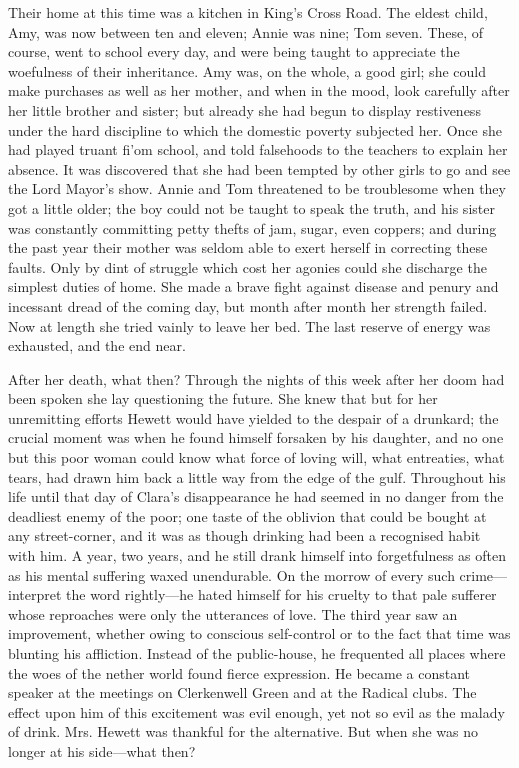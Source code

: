 Their home at this time was a kitchen in King's Cross Road. The eldest
child, Amy, was now between ten and eleven; Annie was
{\protect\hypertarget{161}{}{}}nine; Tom seven. These, of course, went
to school every day, and were being taught to appreciate the woefulness
of their inheritance. Amy was, on the whole, a good girl; she could make
purchases as well as her mother, and when in the mood, look carefully
after her little brother and sister; but already she had begun to
display restiveness under the hard discipline to which the domestic
poverty subjected her. Once she had played truant fi'om school, and told
falsehoods to the teachers to explain her absence. It was discovered
that she had been tempted by other girls to go and see the Lord Mayor's
show. Annie and Tom threatened to be troublesome when they got a little
older; the boy could not be taught to speak the truth, and his sister
was constantly committing petty thefts of jam, sugar, even coppers; and
during the past year their mother was seldom able to exert herself in
correcting these faults. Only by dint of struggle which cost her agonies
could she discharge the simplest duties of home. She made a brave fight
against disease and penury {\protect\hypertarget{162}{}{}}and incessant
dread of the coming day, but month after month her strength failed. Now
at length she tried vainly to leave her bed. The last reserve of energy
was exhausted, and the end near.

After her death, what then? Through the nights of this week after her
doom had been spoken she lay questioning the future. She knew that but
for her unremitting efforts Hewett would have yielded to the despair of
a drunkard; the crucial moment was when he found himself forsaken by his
daughter, and no one but this poor woman could know what force of loving
will, what entreaties, what tears, had drawn him back a little way from
the edge of the gulf. Throughout his life until that day of Clara's
disappearance he had seemed in no danger from the deadliest enemy of the
poor; one taste of the oblivion that could be bought at any
street-corner, and it was as though drinking had been a recognised habit
with him. A year, two years, and he still drank himself into
forgetfulness as often as his mental suffering waxed
{\protect\hypertarget{163}{}{}}unendurable. On the morrow of every such
crime---interpret the word rightly---he hated himself for his cruelty to
that pale sufferer whose reproaches were only the utterances of love.
The third year saw an improvement, whether owing to conscious
self-control or to the fact that time was blunting his affliction.
Instead of the public-house, he frequented all places where the woes of
the nether world found fierce expression. He became a constant speaker
at the meetings on Clerkenwell Green and at the Radical clubs. The
effect upon him of this excitement was evil enough, yet not so evil as
the malady of drink. Mrs. Hewett was thankful for the alternative. But
when she was no longer at his side---what then?

